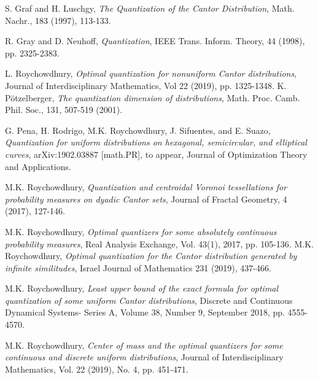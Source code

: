 \documentclass[12pt]{amsart}
\theoremstyle{plain}
\theoremstyle{definition}
\begin{document}
\begin{thebibliography}{9999}
 S. Graf and H. Luschgy, \emph{The Quantization of the Cantor Distribution}, Math. Nachr., 183 (1997), 113-133.


      R. Gray and D. Neuhoff, \emph{Quantization}, IEEE Trans. Inform. Theory,  44 (1998), pp. 2325-2383.

%

 L. Roychowdhury, \emph{Optimal quantization for nonuniform Cantor distributions}, Journal of Interdisciplinary Mathematics, Vol 22 (2019), pp. 1325-1348.
 K. P\"otzelberger, \emph{The quantization dimension of distributions}, Math. Proc. Camb. Phil. Soc., 131, 507-519 (2001).


 G. Pena, H. Rodrigo, M.K. Roychowdhury, J. Sifuentes, and E. Suazo, \emph{Quantization for uniform distributions on hexagonal, semicircular, and elliptical curves}, arXiv:1902.03887 [math.PR], to appear, Journal of Optimization Theory and Applications.

 M.K. Roychowdhury, \emph{Quantization and centroidal Voronoi tessellations for probability measures on dyadic Cantor sets}, Journal of Fractal Geometry, 4 (2017), 127-146.


 M.K. Roychowdhury, \emph{Optimal quantizers for some absolutely continuous probability measures}, Real Analysis Exchange, Vol. 43(1), 2017, pp. 105-136.
 M.K. Roychowdhury, \emph{Optimal quantization for the Cantor distribution generated by infinite similitudes},  Israel Journal of Mathematics 231 (2019), 437-466.



 M.K. Roychowdhury, \emph{Least upper bound of the exact formula for optimal quantization of some uniform Cantor distributions}, Discrete and Continuous Dynamical Systems- Series A, Volume 38, Number 9, September 2018, pp. 4555-4570.

 M.K. Roychowdhury, \emph{Center of mass and the optimal quantizers for some continuous and discrete uniform distributions}, Journal of Interdisciplinary Mathematics, Vol. 22 (2019), No. 4,  pp. 451-471.


\end{thebibliography}
\end{document}
